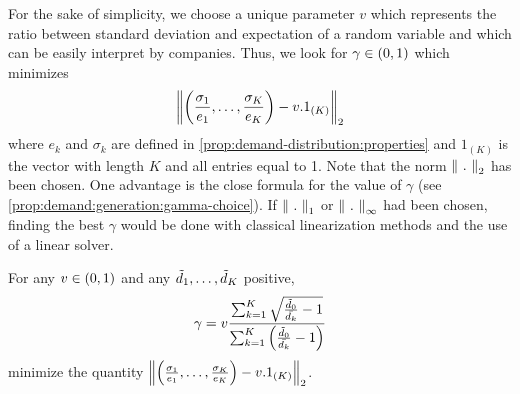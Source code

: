 For the sake of simplicity, we choose a unique parameter $v$ which represents the ratio between standard deviation and expectation of a random variable and which can be easily interpret by companies.
Thus, we look for $\gamma\in\bracket{0,1}$ which minimizes
\begin{equation}
  \norm{\bracket{\frac{\sigma_1}{e_1},\ldots,\frac{\sigma_K}{e_K}}-v.1_{(K)}}_2
\end{equation}
where $e_k$ and $\sigma_k$ are defined in \cref{prop:demand-distribution:properties} and $1_{(K)}$ is the vector with length $K$ and all entries equal to 1.
Note that the norm $\norm{\ .\ }_2$ has been chosen.
One advantage is the close formula for the value of $\gamma$ (see \cref{prop:demand:generation:gamma-choice}).
If $\norm{\ .\ }_1$ or $\norm{\ .\ }_{\infty}$ had been chosen, finding the best $\gamma$ would be done with classical linearization methods and the use of a linear solver.




\begin{prop}\label{prop:demand:generation:gamma-choice}
For any $v\in\bracket{0,1}$ and any $\tilde{d}_1,\ldots,\tilde{d}_K$ positive,
\begin{equation}
  \gamma
  =
  v\frac
  {\sum_{k=1}^K\sqrt{\frac{\tilde{\demand}_0}{\bar{\demand_k}}-1}}
  {\sum_{k=1}^K\bracket{\frac{\tilde{\demand}_0}{\bar{\demand_k}}-1}}
\end{equation}
minimize the quantity
$\norm{\bracket{\frac{\sigma_1}{e_1},\ldots,\frac{\sigma_K}{e_K}}-v.1_{(K)}}_2$.
\end{prop}




